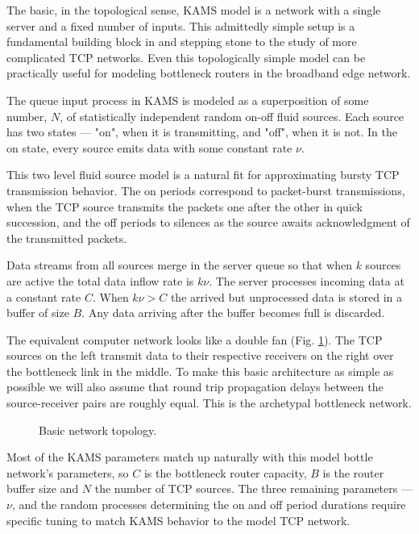 \documentclass{IEEEtran}[10pt,letterpaper,conference]
\begin{document}
The basic, in the topological sense, KAMS model is a network with a single server and a fixed number of inputs. This admittedly simple setup is a fundamental building block in and stepping stone to the study of more complicated TCP networks. Even this topologically simple model can be practically useful for modeling bottleneck routers in the broadband edge network. 

The queue input process in KAMS is modeled as a superposition of some number, $N$, of statistically independent random on-off fluid sources. Each source has two states --- "on", when it is transmitting, and "off", when it is not. In the on state, every source emits data with some constant rate $\nu$. 

This two level fluid source model is a natural fit for approximating bursty TCP transmission behavior. The on periods correspond to packet-burst transmissions, when the TCP source transmits the packets one after the other in quick succession, and the off periods to silences as the source awaits acknowledgment of the transmitted packets. 

Data streams from all sources merge in the server queue so that when $k$ sources are active the total data inflow rate is $k\nu$. The server processes incoming data at a constant rate $C$. When $k\nu>C$ the arrived but unprocessed data is stored in a buffer of size $B$. Any data arriving after the buffer becomes full is discarded.

The equivalent computer network looks like a double fan (Fig. \ref{network}). The TCP sources on the left transmit data to their respective receivers on the right over the bottleneck link in the middle. To make this basic architecture as simple as possible we will also assume that round trip propagation delays between the source-receiver pairs are roughly equal. This is the archetypal bottleneck network. 
\begin{figure}[ht]
\caption{Basic network topology.}
\label{network}
\end{figure}

Most of the KAMS parameters match up naturally with this model bottle network's parameters, so $C$ is the bottleneck router capacity, $B$ is the router buffer size and $N$ the number of TCP sources. The three remaining parameters --- $\nu$, and the random processes determining the on and off period durations require specific tuning to match KAMS behavior to the model TCP network.
\end{document}
